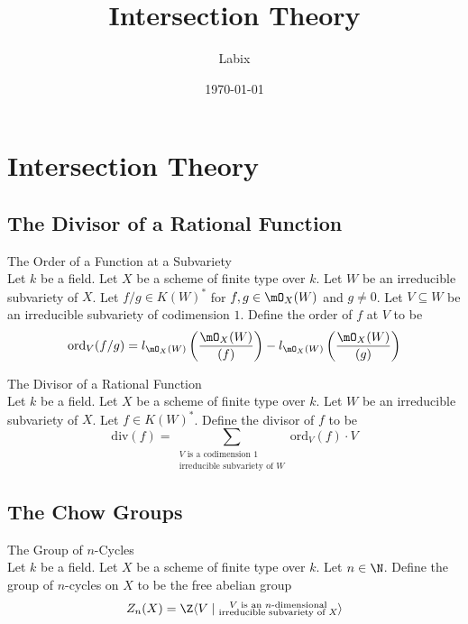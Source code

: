 \documentclass[a4paper]{article}
\title{Intersection Theory}
\author{Labix}
\date{\today}
\begin{document}
\maketitle
\begin{abstract}
\end{abstract}
\pagebreak
\tableofcontents

\pagebreak
\section{Intersection Theory}
\subsection{The Divisor of a Rational Function}
\begin{defn}{The Order of a Function at a Subvariety}{}\\
Let $k$ be a field. Let $X$ be a scheme of finite type over $k$. Let $W$ be an irreducible subvariety of $X$. Let $f/g\in K(W)^\ast$ for $f,g\in\mO_X(W)$ and $g\neq 0$. Let $V\subseteq W$ be an irreducible subvariety of codimension $1$. Define the order of $f$ at $V$ to be $$\text{ord}_V(f/g)=l_{\mO_X(W)}\left(\frac{\mO_X(W)}{(f)}\right)-l_{\mO_X(W)}\left(\frac{\mO_X(W)}{(g)}\right)$$
\end{defn}

\begin{defn}{The Divisor of a Rational Function}{}\\
Let $k$ be a field. Let $X$ be a scheme of finite type over $k$. Let $W$ be an irreducible subvariety of $X$. Let $f\in K(W)^\ast$. Define the divisor of $f$ to be $$\text{div}(f)=\sum_{\substack{V\text{ is a codimension }1\\\text{irreducible subvariety of }W}}\text{ord}_V(f)\cdot V$$
\end{defn}

\subsection{The Chow Groups}
\begin{defn}{The Group of $n$-Cycles}{}\\
Let $k$ be a field. Let $X$ be a scheme of finite type over $k$. Let $n\in\N$. Define the group of $n$-cycles on $X$ to be the free abelian group $$Z_n(X)=\Z\langle V\;|\;\substack{V\text{ is an }n\text{-dimensional}\\\text{irreducible subvariety of }X}\rangle$$
\end{defn}
\end{document}
